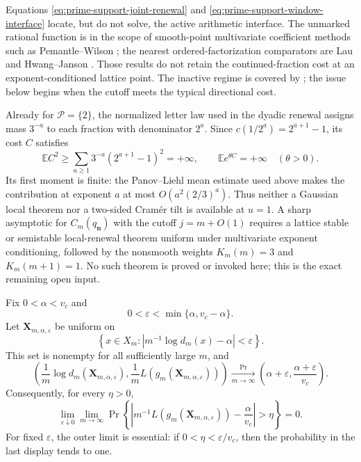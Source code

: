 \begin{remark}
\label{rem:prime-support-local-open-interface}
Equations \eqref{eq:prime-support-joint-renewal} and
\eqref{eq:prime-support-window-interface} locate, but do not solve, the
active arithmetic interface.  The unmarked rational function is in the scope
of smooth-point multivariate coefficient methods such as
Pemantle--Wilson \cite{PemantleWilson2002}; the nearest ordered-factorization
comparators are Lau \cite{Lau2001} and Hwang--Janson
\cite{HwangJanson2011}.  Those results do not retain the continued-fraction
cost at an exponent-conditioned lattice point.  The inactive regime is
covered by ; the issue below
begins when the cutoff meets the typical directional cost.

Already for \(\mathcal P=\{2\}\), the normalized letter law used in the
dyadic renewal assigns mass \(3^{-a}\) to each fraction with denominator
\(2^a\).  Since
\(c(1/2^a)=2^{a+1}-1\), its cost \(C\) satisfies
\[
 \mathbb E C^2
 \ge\sum_{a\ge1}3^{-a}(2^{a+1}-1)^2=+\infty,
 \qquad
 \mathbb E e^{\theta C}=+\infty\quad(\theta>0).
\]
Its first moment is finite: the Panov--Liehl mean estimate used above makes
the contribution at exponent \(a\) at most
\(O(a^2(2/3)^a)\).  Thus neither a Gaussian local theorem nor a two-sided
Cram\'er tilt is available at \(u=1\).  A sharp asymptotic for
\(C_m(q_{\mathbf n})\) with the cutoff \(j=m+O(1)\) requires a lattice
stable or semistable local-renewal theorem uniform under multivariate exponent
conditioning, followed by the nonsmooth weights \(K_m(m)=3\) and
\(K_m(m+1)=1\).  No such theorem is proved or invoked here; this is the exact
remaining open input.
\end{remark}

\fi
\ifdefined\supplementonly
\begin{theorem}
\label{thm:conditional-phase-separation}
Fix \(0<\alpha<v_c\) and
\[
 0<\varepsilon<\min\{\alpha,v_c-\alpha\}.
\]
Let \(\mathbf X_{m,\alpha,\varepsilon}\) be uniform on
\[
 \left\{x\in X_m:
 \left|m^{-1}\log d_m(x)-\alpha\right|<\varepsilon\right\}.
\]
This set is nonempty for all sufficiently large \(m\), and
\begin{equation}
 \left(
  \frac1m\log d_m(\mathbf X_{m,\alpha,\varepsilon}),
  \frac1mL(g_m(\mathbf X_{m,\alpha,\varepsilon}))
 \right)
 \xrightarrow[m\to\infty]{\Pr}
 \left(\alpha+\varepsilon,
       \frac{\alpha+\varepsilon}{v_c}\right).
 \label{eq:conditional-phase-separation}
\end{equation}
Consequently, for every \(\eta>0\),
\[
 \lim_{\varepsilon\downarrow0}\lim_{m\to\infty}
 \Pr\left\{
  \left|m^{-1}L(g_m(\mathbf X_{m,\alpha,\varepsilon}))
       -\frac\alpha{v_c}\right|>\eta
 \right\}=0.
\]
For fixed \(\varepsilon\), the outer limit is essential: if
\(0<\eta<\varepsilon/v_c\), then the probability in the last display tends
to one.
\end{theorem}

